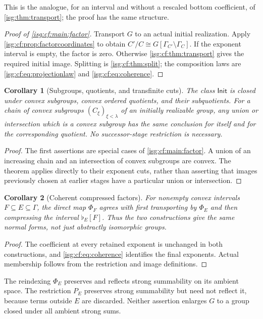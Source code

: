 \documentclass[11pt]{article}
\newtheorem{corollary}[corollary]{Corollary}
\theoremstyle{definition}
\theoremstyle{remark}
\newcommand{\IR}{\mathsf{Init}}
\newcommand{\cmp}[1]{\flat_{#1}}
\begin{document}
This is the analogue, for an interval and without a rescaled bottom
coefficient, of \cref{isg:thm:transport}; the proof has the same
structure.

\begin{proof}[Proof of \cref{isg:cf:main:factor}]
Transport $G$ to an actual initial realization. Apply
\cref{isg:cf:prop:factorcoordinates} to obtain
$C'/C\cong G[\Gamma_{C'}\setminus\Gamma_C]$.
If the exponent interval is empty, the factor is zero. Otherwise
\cref{isg:cf:thm:transport} gives the required initial image. Splitting is
\cref{isg:cf:thm:split}; the composition laws are
\eqref{isg:cf:eq:projectionlaw} and \eqref{isg:cf:eq:coherence}.
\end{proof}

\begin{corollary}[Subgroups, quotients, and transfinite cuts]\label{isg:cf:cor:closure}
The class $\IR$ is closed under convex subgroups, convex ordered
quotients, and their subquotients. For a chain of convex subgroups
$(C_\xi)_{\xi<\lambda}$ of an initially realizable group, any union or
intersection which is a convex subgroup has the same conclusion for
itself and for the corresponding quotient. No successor-stage
restriction is necessary.
\end{corollary}
\begin{proof}
The first assertions are special cases of \cref{isg:cf:main:factor}. A
union of an increasing chain and an intersection of convex subgroups are
convex. The theorem applies directly to their exponent cuts, rather
than asserting that images previously chosen at earlier stages have a
particular union or intersection.
\end{proof}

\begin{corollary}[Coherent compressed factors]\label{isg:cf:cor:coherentfactors}
For nonempty convex intervals $F\subseteq E\subseteq\Gamma$, the direct
map $\Phi_F$ agrees with first transporting by $\Phi_E$ and then
compressing the interval $\cmp E[F]$. Thus the two constructions give
the same normal forms, not just abstractly isomorphic groups.
\end{corollary}
\begin{proof}
The coefficient at every retained exponent is unchanged in both
constructions, and \eqref{isg:cf:eq:coherence} identifies the final
exponents. Actual membership follows from the restriction and image
definitions.
\end{proof}

\begin{remark}\label{isg:cf:rem:strongsums}
The reindexing $\Phi_E$ preserves and reflects strong summability on its
ambient space. The restriction $P_E$ preserves strong summability but
need not reflect it, because terms outside $E$ are discarded. Neither
assertion enlarges $G$ to a group closed under all ambient strong sums.
\end{remark}
\end{document}
